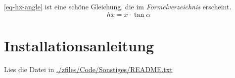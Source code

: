 \cref{eq-hx-angle} ist eine schöne Gleichung, die im \emph{Formelverzeichnis}
erscheint.
\label{eq-hx-angle}\begin{equation}
hx = x \cdot \tan \alpha
\end{equation}



\section{Installationsanleitung} \label{fig-readme}
Lies die Datei in \href{./zfiles/Code/Sonstiges/README.txt}{./zfiles/Code/Sonstiges/README.txt}
%  

\endinput
